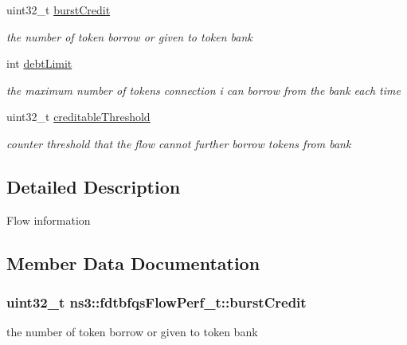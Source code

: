 \begin{DoxyCompactItemize}
uint32\+\_\+t \hyperlink{structns3_1_1fdtbfqsFlowPerf__t_a1a53852d70789df71b2a0d633acfca4c}{burst\+Credit}
\begin{DoxyCompactList}\small\item\em the number of token borrow or given to token bank \end{DoxyCompactList}\item 
int \hyperlink{structns3_1_1fdtbfqsFlowPerf__t_a3a00b796b2e79a3c3f43c456a2fbd069}{debt\+Limit}
\begin{DoxyCompactList}\small\item\em the maximum number of tokens connection i can borrow from the bank each time \end{DoxyCompactList}\item 
uint32\+\_\+t \hyperlink{structns3_1_1fdtbfqsFlowPerf__t_a7607dde88a053cb2c41b17532368a220}{creditable\+Threshold}
\begin{DoxyCompactList}\small\item\em counter threshold that the flow cannot further borrow tokens from bank \end{DoxyCompactList}\end{DoxyCompactItemize}


\subsection{Detailed Description}
Flow information 

\subsection{Member Data Documentation}
\subsubsection[{\texorpdfstring{burst\+Credit}{burstCredit}}]{\setlength{\rightskip}{0pt plus 5cm}uint32\+\_\+t ns3\+::fdtbfqs\+Flow\+Perf\+\_\+t\+::burst\+Credit}\hypertarget{structns3_1_1fdtbfqsFlowPerf__t_a1a53852d70789df71b2a0d633acfca4c}{}\label{structns3_1_1fdtbfqsFlowPerf__t_a1a53852d70789df71b2a0d633acfca4c}


the number of token borrow or given to token bank 

